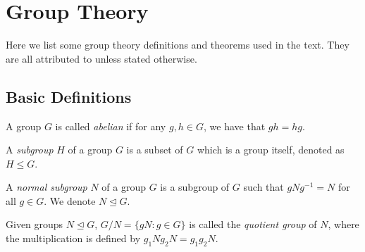 \section{Group Theory}
Here we list some group theory definitions and theorems used in the text. They are all attributed to \cite{group-theory-uon, armstrong_groups_1988} unless stated otherwise.

\subsection{Basic Definitions}

\begin{definition}
	A group $G$ is called \textit{abelian} if for any $g, h \in G$, we have that $g h = h g$. 
\end{definition}

\begin{definition}
	A \textit{subgroup} $H$ of a group $G$ is a subset of $G$ which is a group itself, denoted as $H \le G$. 
\end{definition}

\begin{definition}
	A \textit{normal subgroup} $N$ of a group $G$ is a subgroup of $G$ such that $gNg^{-1} = N$ for all $g \in G$. We denote $N \trianglelefteq G$. 
\end{definition}



\begin{definition}
	Given groups $N \trianglelefteq G$, $G / N = \{g N : g \in G\}$ is called the \textit{quotient group} of $N$, where the multiplication is defined by $g_1N g_2N = g_1g_2N$. 
\end{definition}

